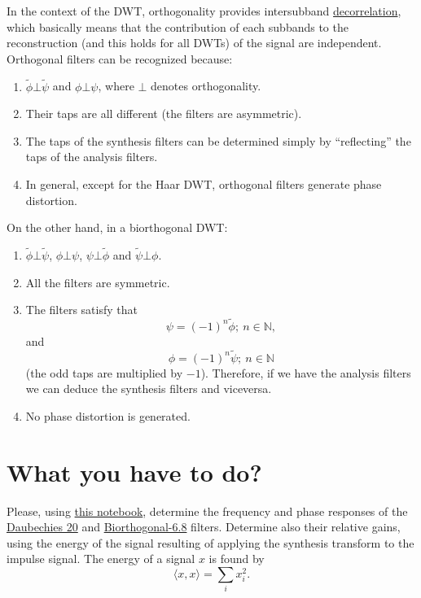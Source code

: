 In the context of the DWT, orthogonality provides intersubband
\href{https://en.wikipedia.org/wiki/Decorrelation}{decorrelation},
which basically means that the contribution of each subbands to the
reconstruction (and this holds for all DWTs) of the signal are
independent. Orthogonal filters can be recognized because:
\begin{enumerate}
\item $\tilde\phi\bot\tilde\psi$ and $\phi\bot\psi$, where $\bot$
  denotes orthogonality.
\item Their taps are all different (the filters are asymmetric).
\item The taps of the synthesis filters can be determined simply by
  ``reflecting'' the taps of the analysis filters.
\item In general, except for the Haar DWT, orthogonal filters generate
  phase distortion.
\end{enumerate}

On the other hand, in a biorthogonal DWT:
\begin{enumerate}
\item $\tilde\phi\bot\tilde\psi$, $\phi\bot\psi$, $\psi\bot\tilde\phi$
  and $\tilde\psi\bot\phi$.
\item All the filters are symmetric.
\item The filters satisfy that
  \begin{equation}
    \psi=(-1)^n\tilde\phi;~n\in\mathbb{N},
  \end{equation}
  and
  \begin{equation}
    \phi=(-1)^n\tilde\psi;~n\in\mathbb{N}
  \end{equation}
    (the odd taps are multiplied by $-1$). Therefore, if we have the
  analysis filters we can deduce the synthesis filters and viceversa.
\item No phase distortion is generated.
\end{enumerate}

\section{What you have to do?}

Please, using
\href{https://github.com/Sistemas-Multimedia/Sistemas-Multimedia.github.io/blob/master/study_guide/07-DWT/dwt_filters_analysis.ipynb}{this
  notebook}, determine the frequency and phase responses of the
\href{http://wavelets.pybytes.com/wavelet/db20/}{Daubechies 20} and
\href{http://wavelets.pybytes.com/wavelet/bior6.8/}{Biorthogonal-6.8}
filters. Determine also their relative gains, using the energy of the
signal resulting of applying the synthesis transform to the impulse
signal. The energy of a signal $x$ is found by
\begin{equation}
  \langle x, x\rangle =  \sum_{i}{x_i^2}.
\end{equation}

